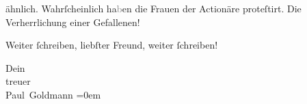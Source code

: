                ähnlich. Wahrſcheinlich ha\textcolor{gray}{b}en die Frauen der Actionäre {\pb}proteſtirt. Die Verherrlichung einer Gefallenen!
                  \label{K_L02722-3v}\label{K_L02722-3}\pend
           
\pstart
           Weiter{ }ſchreiben, liebſter Freund, weiter{ }ſchreiben!\pend
           
\pstart
           Dein {\\[\baselineskip]}treuer {\\[\baselineskip]}\spacefill\mbox{Paul Goldmann}\pend
           \leftskip=0em{}\endnumbering{}  \newcommand{\dateiname}{L02722}\newcommand{\titel}{Paul Goldmann an Arthur Schnitzler, 6. 12. [1893]}\newcommand{\editorInnen}{Martin Anton Müller und Laura Untner}
